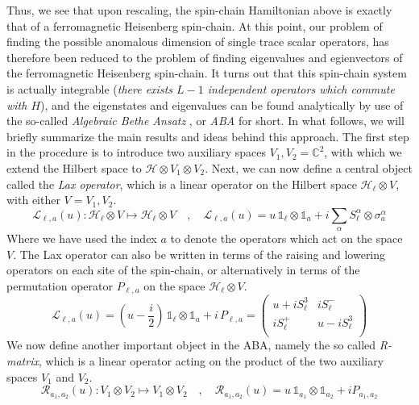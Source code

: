 %
%
Thus, we see that upon rescaling, the spin-chain Hamiltonian above is exactly that of a ferromagnetic Heisenberg spin-chain. At this point, our problem of finding the possible anomalous dimension of single trace scalar operators, has therefore been reduced to the problem of finding eigenvalues and egienvectors of the ferromagnetic Heisenberg spin-chain. It turns out that this spin-chain system is actually integrable (\textit{there exists $L-1$ independent operators which commute with $H$}), and the eigenstates and eigenvalues can be found analytically by use of the so-called \textit{Algebraic Bethe Ansatz} \cite{Algebraic Bethe Ansatz}, or \textit{ABA} for short. In what follows, we will briefly summarize the main results and ideas behind this approach. The first step in the procedure is to introduce two auxiliary spaces $V_1, V_2 = \mathbb{C}^2$, with which we extend the Hilbert space to $\mathcal{H} \otimes V_1 \otimes V_2$. Next, we can now define a central object called the \textit{Lax operator}, which is a linear operator on the Hilbert space $\mathcal{H}_\ell \otimes V$, with either $V = V_1, V_2$.
%
%
\begin{equation}\label{Lax operator}
\mathcal{L}_{\ell,a}(u):
\mathcal{H}_\ell \otimes V
\mapsto
\mathcal{H}_\ell \otimes V
%
\quad , \quad
%
\mathcal{L}_{\ell,a}(u)
=
u \, \mathbb{1}_{\ell} \otimes \mathbb{1}_{a}
+
i \sum_{\alpha} S_\ell^\alpha \otimes \sigma^\alpha_{a}
\end{equation}
%
%
Where we have used the index $a$ to denote the operators which act on the space $V$. The Lax operator can also be written in terms of the raising and lowering operators on each site of the spin-chain, or alternatively in terms of the permutation operator $P_{\ell,a}$ on the space $\mathcal{H}_\ell \otimes V$.
%
%
\begin{equation}\label{Lax operator rewritten}
\mathcal{L}_{\ell,a}(u)
=
\left( u - \frac{i}{2} \right) \, \mathbb{1}_\ell \otimes \mathbb{1}_a
+
i \, P_{\ell,a}
=
\left(\begin{array}{cc}
u + i S_\ell^{3} & i S_\ell^{-} \\
i S_\ell^{+} & u - i S_\ell^{3} \\
\end{array}\right)
\end{equation}
%
%
We now define another important object in the ABA, namely the so called \textit{R-matrix}, which is a linear operator acting on the product of the two auxiliary spaces $V_1$ and $V_2$.
%
%
\begin{equation}
\mathcal{R}_{a_1,a_2}(u):
V_1 \otimes V_2 \mapsto V_1 \otimes V_2
%
\quad , \quad
%
\mathcal{R}_{a_1,a_2}(u)
=
u \, \mathbb{1}_{a_1} \otimes \mathbb{1}_{a_2}
+
i P_{a_1, a_2}
\end{equation}

